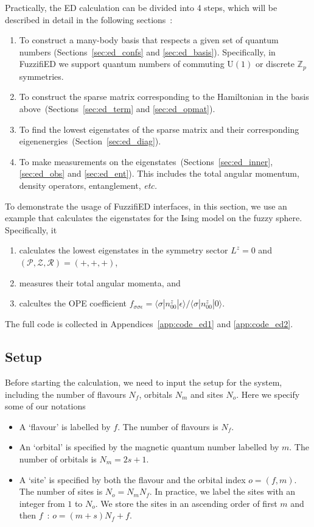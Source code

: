 \documentclass{timesjhep}
\begin{document}
Practically, the ED calculation can be divided into 4 steps, which will be described in detail in the following sections~:
\begin{enumerate}
    \item To construct a many-body basis that respects a given set of quantum numbers (Sections~\ref{sec:ed_confs} and \ref{sec:ed_basis}). Specifically, in FuzzifiED we support quantum numbers of commuting $\mathrm{U}(1)$ or discrete $\mathbb{Z}_p$ symmetries.
    \item To construct the sparse matrix corresponding to the Hamiltonian in the basis above~(Sections~\ref{sec:ed_term} and \ref{sec:ed_opmat}). 
    \item To find the lowest eigenstates of the sparse matrix and their corresponding eigenenergies~(Section~\ref{sec:ed_diag}).
    \item To make measurements on the eigenstates~(Sections~\ref{sec:ed_inner}, \ref{sec:ed_obs} and \ref{sec:ed_ent}). This includes the total angular momentum, density operators, entanglement, \textit{etc.}
\end{enumerate}

To demonstrate the usage of FuzzifiED interfaces, in this section, we use an example that calculates the eigenstates for the Ising model on the fuzzy sphere. Specifically, it
\begin{enumerate}
    \item calculates the lowest eigenstates in the symmetry sector $L^z=0$ and $(\mathcal{P},\mathcal{Z},\mathcal{R})=(+,+,+)$,
    \item measures their total angular momenta, and 
    \item calcultes the OPE coefficient $f_{\sigma\sigma\epsilon}=\langle \sigma|n^z_{00}|\epsilon\rangle/\langle \sigma|n^z_{00}|0\rangle$.
\end{enumerate}
The full code is collected in Appendices~\ref{app:code_ed1} and \ref{app:code_ed2}.

\subsection{Setup}
\label{sec:ed_setup}

Before starting the calculation, we need to input the setup for the system, including the number of flavours $N_f$, orbitals $N_m$ and sites $N_o$. Here we specify some of our notations
\begin{itemize}
    \item A `flavour' is labelled by $f$. The number of flavours is $N_f$.
    \item An `orbital' is specified by the magnetic quantum number labelled by $m$. The number of orbitals is $N_m=2s+1$.
    \item A `site' is specified by both the flavour and the orbital index $o=(f,m)$. The number of sites is $N_o=N_mN_f$. In practice, we label the sites with an integer from $1$ to $N_o$. We store the sites in an ascending order of first $m$ and then $f$~: $o=(m+s)N_f+f$.
\end{itemize}
\end{document}
